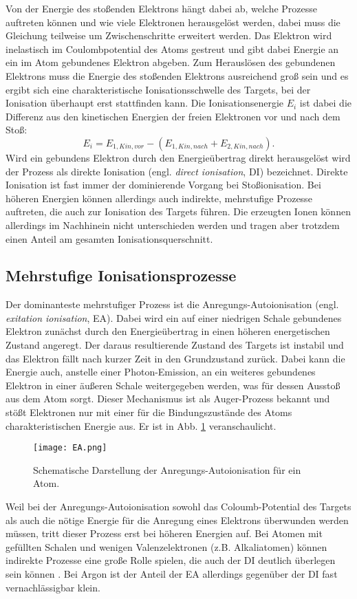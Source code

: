 Von der Energie des stoßenden Elektrons hängt dabei ab, welche Prozesse auftreten können und wie viele Elektronen herausgelöst werden, dabei muss die Gleichung teilweise um Zwischenschritte erweitert werden. Das Elektron wird inelastisch im Coulombpotential des Atoms gestreut und gibt dabei Energie an ein im Atom gebundenes Elektron abgeben. Zum Herauslösen des gebundenen Elektrons muss die Energie des stoßenden Elektrons ausreichend groß sein und es ergibt sich eine charakteristische Ionisationsschwelle des Targets, bei der Ionisation überhaupt erst stattfinden kann. Die Ionisationsenergie $E_i$ ist dabei die Differenz aus den kinetischen Energien der freien Elektronen vor und nach dem Stoß: 
\begin{equation}
    E_i = E_{1,Kin, vor} - (E_{1,Kin, nach} + E_{2,Kin, nach}).
\end{equation} 
Wird ein gebundens Elektron durch den Energieübertrag direkt herausgelöst wird der Prozess als direkte Ionisation (engl. \textit{direct ionisation}, DI) bezeichnet. Direkte Ionisation ist fast immer der dominierende Vorgang bei Stoßionisation. Bei höheren Energien können allerdings auch indirekte, mehrstufige Prozesse auftreten, die auch zur Ionisation des Targets führen. Die erzeugten Ionen können allerdings im Nachhinein nicht unterschieden werden und tragen aber trotzdem einen Anteil am gesamten Ionisationsquerschnitt.

\subsection{Mehrstufige Ionisationsprozesse}
Der dominanteste mehrstufiger Prozess ist die Anregungs-Autoionisation (engl. \textit{exitation ionisation}, EA). Dabei wird ein auf einer niedrigen Schale gebundenes Elektron zunächst durch den Energieübertrag in einen höheren energetischen Zustand angeregt. Der daraus resultierende Zustand des Targets ist instabil und das Elektron fällt nach kurzer Zeit in den Grundzustand zurück. Dabei kann die Energie auch, anstelle einer Photon-Emission, an ein weiteres gebundenes Elektron in einer äußeren Schale weitergegeben werden, was für dessen Ausstoß aus dem Atom sorgt. Dieser Mechanismus ist als Auger-Prozess bekannt und stößt Elektronen nur mit einer für die Bindungszustände des Atoms charakteristischen Energie aus. Er ist in Abb. \ref{fig:EA} veranschaulicht.
\begin{figure}[h]
    \centering
    \texttt{[image: EA.png]}
    \caption{Schematische Darstellung der Anregungs-Autoionisation für ein Atom.}
    \label{fig:EA}
\end{figure}
Weil bei der Anregungs-Autoionisation sowohl das Coloumb-Potential des Targets als auch die nötige Energie für die Anregung eines Elektrons überwunden werden müssen, tritt dieser Prozess erst bei höheren Energien auf. Bei Atomen mit gefüllten Schalen und wenigen Valenzelektronen (z.B. Alkaliatomen) können indirekte Prozesse eine große Rolle spielen, die auch der DI deutlich überlegen sein können \cite{EII}. Bei Argon ist der Anteil der EA allerdings gegenüber der DI fast vernachlässigbar klein. 

